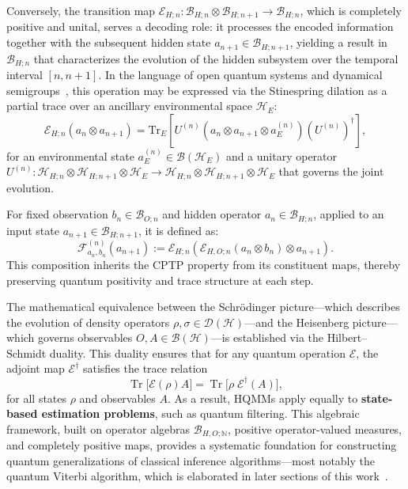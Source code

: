 \documentclass[12pt, reco]{article}
\begin{document}
Conversely, the transition map $\mathcal{E}_{H;n} : \mathcal{B}_{H;n} \otimes \mathcal{B}_{H;n+1} \to \mathcal{B}_{H;n}$, which is completely positive and unital, serves a decoding role: it processes the encoded information together with the subsequent hidden state $a_{n+1} \in \mathcal{B}_{H;n+1}$, yielding a result in $\mathcal{B}_{H;n}$ that characterizes the evolution of the hidden subsystem over the temporal interval $[n, n+1]$. In the language of open quantum systems and dynamical semigroups~\cite{ticozzi2008}, this operation may be expressed via the Stinespring dilation as a partial trace over an ancillary environmental space $\mathcal{H}_E$:
\begin{equation}
\mathcal{E}_{H;n}(a_n \otimes a_{n+1}) = \text{Tr}_{E}\left[U^{(n)}(a_n \otimes a_{n+1} \otimes a_E^{(n)})(U^{(n)})^\dagger\right],
\end{equation}
for an environmental state $a_E^{(n)} \in \mathcal{B}(\mathcal{H}_E)$ and a unitary operator $U^{(n)} : \mathcal{H}_{H;n} \otimes \mathcal{H}_{H;n+1} \otimes \mathcal{H}_E \to \mathcal{H}_{H;n} \otimes \mathcal{H}_{H;n+1} \otimes \mathcal{H}_E$ that governs the joint evolution.

  For fixed observation $b_n \in \mathcal{B}_{O;n}$ and hidden operator $a_n \in \mathcal{B}_{H;n}$, applied to an input state $a_{n+1} \in \mathcal{B}_{H;n+1}$, it is defined as:
\begin{equation}
\mathcal{F}_{a_n,b_n}^{(n)}(a_{n+1}) := \mathcal{E}_{H;n}\left(\mathcal{E}_{H,O;n}(a_n \otimes b_n) \otimes a_{n+1}\right).
\end{equation}
This composition inherits the CPTP property from its constituent maps, thereby preserving quantum positivity and trace structure at each step.







The mathematical equivalence between the Schrödinger picture---which describes the evolution of density operators \(\rho, \sigma \in \mathcal{D}(\mathcal{H})\)---and the Heisenberg picture---which governs observables \(O, A \in \mathcal{B}(\mathcal{H})\)---is established via the  Hilbert--Schmidt duality. This duality ensures that for any quantum operation \(\mathcal{E}\), the adjoint map \(\mathcal{E}^{\dagger}\) satisfies the trace relation
\[
\operatorname{Tr}\!\big[\mathcal{E}(\rho) A\big] = \operatorname{Tr}\!\big[\rho \; \mathcal{E}^{\dagger}(A)\big],
\]
for all states \(\rho\) and observables \(A\). As a result, HQMMs apply equally to \textbf{state-based estimation problems}, such as quantum filtering. This algebraic framework, built on operator algebras \(\mathcal{B}_{H,O;\mathbb{N}}\), positive operator-valued measures, and completely positive maps, provides a systematic foundation for constructing quantum generalizations of classical inference algorithms---most notably the quantum Viterbi algorithm, which is elaborated in later sections of this work~\cite{FV05, V03, ASS20}.
\end{document}
